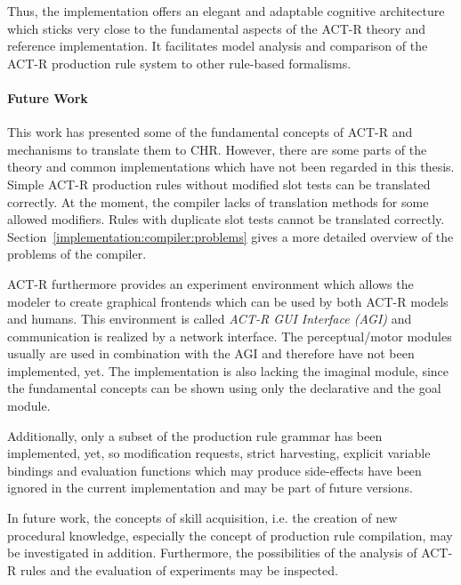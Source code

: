 Thus, the implementation offers an elegant and adaptable cognitive architecture which sticks very close to the fundamental aspects of the ACT-R theory and reference implementation. It facilitates model analysis and comparison of the ACT-R production rule system to other rule-based formalisms.

\paragraph{Future Work}

This work has presented some of the fundamental concepts of ACT-R and mechanisms to translate them to CHR. However, there are some parts of the theory and common implementations which have not been regarded in this thesis. Simple ACT-R production rules without modified slot tests can be translated correctly. At the moment, the compiler lacks of translation methods for some allowed modifiers. Rules with duplicate slot tests cannot be translated correctly. Section~\ref{implementation:compiler:problems} gives a more detailed overview of the problems of the compiler.

ACT-R furthermore provides an experiment environment which allows the modeler to create graphical frontends which can be used by both ACT-R models and humans. This environment is called \emph{ACT-R GUI Interface (AGI)} \cite{agi_reference} and communication is realized by a network interface. The perceptual/motor modules usually are used in combination with the AGI and therefore have not been implemented, yet. The implementation is also lacking the imaginal module, since the fundamental concepts can be shown using only the declarative and the goal module.

Additionally, only a subset of the production rule grammar has been implemented, yet, so modification requests, strict harvesting, explicit variable bindings and evaluation functions which may produce side-effects have been ignored in the current implementation and may be part of future versions.

In future work, the concepts of skill acquisition, i.e. the creation of new procedural knowledge, especially the concept of production rule compilation, may be investigated in addition. Furthermore, the possibilities of the analysis of ACT-R rules and the evaluation of experiments may be inspected.

